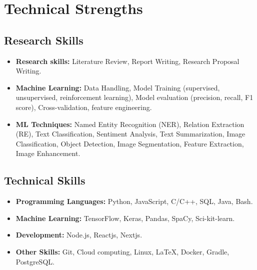 
\section{Technical Strengths}


\subsection{\textbf{Research Skills}}

\begin{itemize}[leftmargin=.3in]
\setlength\itemsep{.1em}
    \item \textbf{Research skills:} Literature Review, Report Writing,  Research Proposal Writing.

    \item \textbf{Machine Learning:} Data Handling, Model Training (supervised, unsupervised, reinforcement learning), Model evaluation (precision, recall, F1 score), Cross-validation, feature engineering.\textbf{}
    

    \item \textbf{ML Techniques:} Named Entity Recognition (NER), Relation Extraction (RE), Text Classification, Sentiment Analysis, Text Summarization, Image Classification, Object Detection, Image Segmentation, Feature Extraction, Image Enhancement.


    
\end{itemize}
\vspace{3pt}

\subsection{Technical Skills}

\begin{itemize}[leftmargin=.3in]
\setlength\itemsep{.1em}
    \item \textbf{Programming Languages:} Python, JavaScript, C/C++, SQL, Java, Bash.

    \item \textbf{Machine Learning:} TensorFlow, Keras, Pandas, SpaCy, Sci-kit-learn.
    
    \item \textbf{Development: } Node.js, Reactjs, Nextjs.
    
    \item \textbf{Other Skills: } Git, Cloud computing, Linux, \LaTeX, Docker, Gradle, PostgreSQL.
\end{itemize}
